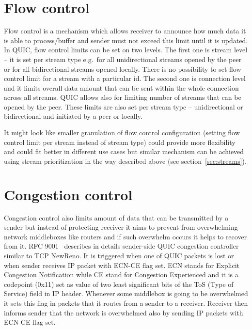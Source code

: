 \section{Flow control}
\label{sec:flow-control-and-congestion-control}
Flow control is a mechanism which allows receiver to announce how much data it is able to process/buffer and sender must
not exceed this limit until it is updated.
In QUIC, flow control limits can be set on two levels.
The first one is stream level -- it is set per stream type e.g.\ for all unidirectional streams opened by the peer or for all bidirectional streams opened locally.
There is no possibility to set flow control limit for a stream with a particular id.
The second one is connection level and it limits overall data amount that can be sent within the whole connection across all streams.
QUIC allows also for limiting number of streams that can be opened by the peer.
These limits are also set per stream type -- unidirectional or bidirectional and initiated by a peer or locally.

It might look like smaller granulation of flow control configuration (setting flow control limit per stream instead of
stream type) could provide more flexibility and could fit better in different use cases but similar mechanism can
be achieved using stream prioritization in the way described above (see section~\ref{sec:streams}).


\section{Congestion control}
\label{sec:congestion-control}
Congestion control also limits amount of data that can be transmitted by a sender but instead of protecting receiver it aims to prevent
from overwhelming network middleboxes like routers and if such overwhelm occurs it helps to recover from it.
RFC 9001~\cite{rfc9001} describes in details sender-side QUIC congestion controller similar to TCP NewReno.
It is triggered when one of QUIC packets is lost or when sender receives IP packet with ECN-CE flag set.
ECN stands for Explicit Congestion Notification while CE stand for Congestion Experienced and it is a codepoint (0x11) set as
value of two least significant bits of the ToS (Type of Service) field in IP header.
Whenever some middlebox is going to be overwhelmed it sets this flag in packets that it routes from a sender to a receiver.
Receiver then informs sender that the network is overwhelmed also by sending IP packets with ECN-CE flag set.

